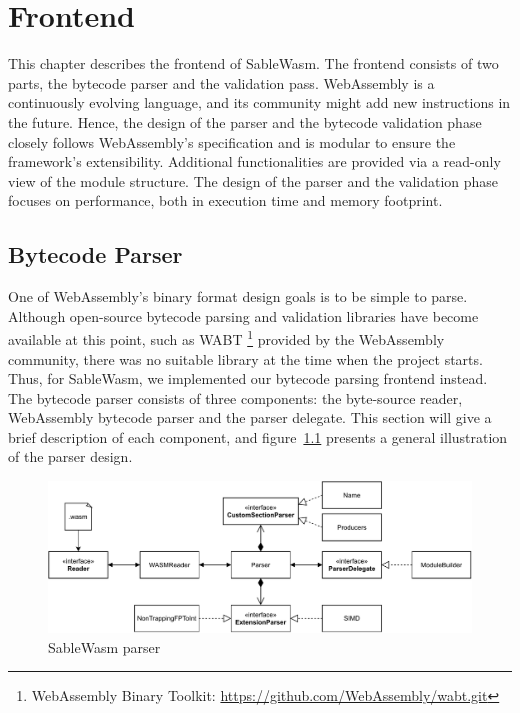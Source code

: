 \chapter{Frontend}

This chapter describes the frontend of SableWasm. The frontend consists of two
parts, the bytecode parser and the validation pass. WebAssembly is a
continuously evolving language, and its community might add new instructions in
the future. Hence, the design of the parser and the bytecode validation phase
closely follows WebAssembly's specification and is modular to ensure the
framework's extensibility. Additional functionalities are provided via a
read-only view of the module structure. The design of the parser and the
validation phase focuses on performance, both in execution time and memory
footprint.

\section{Bytecode Parser}

One of WebAssembly's binary format design goals is to be simple to parse.
Although open-source bytecode parsing and validation libraries have become
available at this point, such as WABT \footnote{WebAssembly Binary Toolkit:
  \url{https://github.com/WebAssembly/wabt.git}} provided by the WebAssembly
community, there was no suitable library at the time when the project starts.
Thus, for SableWasm, we implemented our bytecode parsing frontend instead. The
bytecode parser consists of three components: the byte-source reader,
WebAssembly bytecode parser and the parser delegate. This section will give a
brief description of each component, and figure~\ref{fig:sablewasm-parser}
presents a general illustration of the parser design.

\begin{figure}
  \centering
  \includegraphics[width=\textwidth]{Images/sablewasm-parser.pdf}
  \caption{SableWasm parser}
  \label{fig:sablewasm-parser}
\end{figure}

